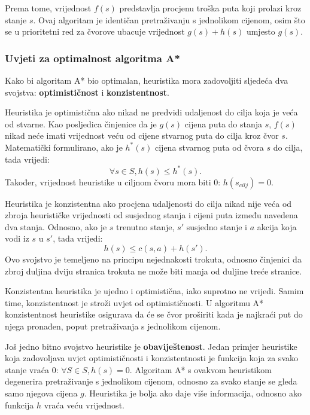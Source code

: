 \documentclass[times, utf8, zavrsni, numeric]{fer}
\begin{document}
Prema tome, vrijednost \(f(s)\) predstavlja procjenu troška puta koji prolazi kroz stanje \(s\).
Ovaj algoritam je identičan pretraživanju s jednolikom cijenom, osim što se u prioritetni red za čvorove ubacuje vrijednost \(g(s) + h(s)\) umjesto \(g(s)\).


\subsubsection{Uvjeti za optimalnost algoritma A*}
Kako bi algoritam A* bio optimalan, heuristika mora zadovoljiti sljedeća dva svojstva: \textbf{optimističnost} i \textbf{konzistentnost}.

\par Heuristika je optimistična ako nikad ne predvidi udaljenost do cilja koja je veća od stvarne. 
Kao posljedica činjenice da je \(g(s)\) cijena puta do stanja \(s\), \(f(s)\) nikad neće imati vrijednost veću od cijene stvarnog puta do cilja kroz čvor \(s\).
Matematički formulirano, ako je \(h^*(s)\) cijena stvarnog puta od čvora \(s\) do cilja, tada vrijedi:
\begin{equation}
\forall s \in S, h(s) \leq h^*(s).
\end{equation} 
Također, vrijednost heuristike u ciljnom čvoru mora biti 0: \(h(s_{cilj}) = 0\).

\par Heuristika je konzistentna ako procjena udaljenosti do cilja nikad nije veća  od zbroja heurističke vrijednosti od susjednog stanja i cijeni puta između navedena dva stanja.
Odnosno, ako je \(s\) trenutno stanje, \(s'\) susjedno stanje i \(a\) akcija koja vodi iz \(s\) u \(s'\), tada vrijedi:
\begin{equation}
h(s) \leq c(s, a) + h(s').
\end{equation} 
Ovo svojstvo je temeljeno na principu nejednakosti trokuta, odnosno činjenici da zbroj duljina dviju stranica trokuta ne može biti manja od duljine treće stranice.


\par Konzistentna heuristika je ujedno i optimistična, iako suprotno ne vrijedi. 
Samim time, konzistentnost je stroži uvjet od optimističnosti. 
U algoritmu A* konzistentnost heuristike osigurava da će se čvor proširiti kada je najkraći put do njega pronađen, poput pretraživanja s jednolikom cijenom.

\par Još jedno bitno svojstvo heuristike je \textbf{obaviještenost}. 
Jedan primjer heuristike koja zadovoljava uvjet optimističnosti i konzistentnosti je funkcija koja za svako stanje vraća 0: \(\forall S \in S, h(s) = 0\). 
Algoritam A* s ovakvom heuristikom degenerira pretraživanje s jednolikom cijenom, odnosno za svako stanje se gleda samo njegova cijena \(g\). 
Heuristika je bolja ako daje više informacija, odnosno ako funkcija \(h\) vraća veću vrijednost.
\end{document}
